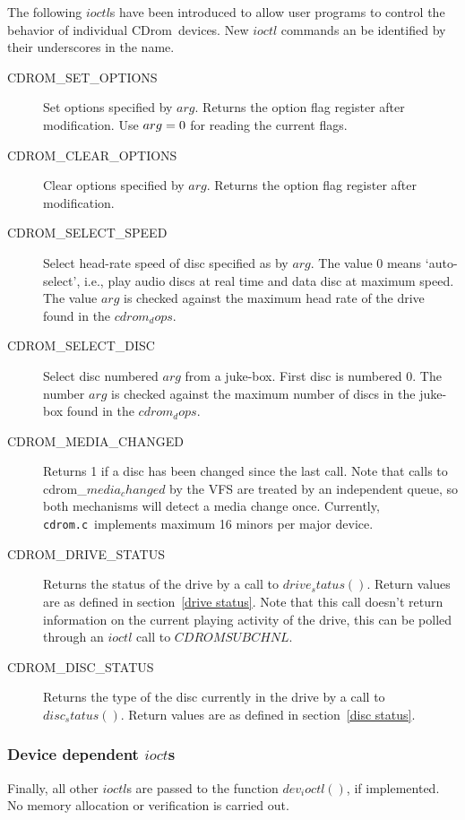 \documentclass{article}
\def\cdrom{{\sc CDrom}}
\def\cdromc{{\tt cdrom.c}}
\begin{document}
The following $ioctl$s have been introduced to allow user programs to
control the behavior of individual \cdrom\ devices. New $ioctl$
commands an be identified by their underscores in the name.
\begin{description}
\item[CDROM_SET_OPTIONS] Set options specified by $arg$. Returns the
option flag register after modification. Use  $arg = \rm0$ for reading
the current flags.
\item[CDROM_CLEAR_OPTIONS] Clear options specified by $arg$. Returns
  the option flag register after modification.
\item[CDROM_SELECT_SPEED] Select head-rate speed of disc specified as
  by $arg$. The value 0 means `auto-select', i.e., play audio discs at
  real time and data disc at maximum speed. The value $arg$ is
  checked against the maximum head rate of the drive found in
  the $cdrom_dops$.
\item[CDROM_SELECT_DISC] Select disc numbered $arg$ from a juke-box.
  First disc is numbered 0. The number $arg$ is checked against the
  maximum number of discs in the juke-box found in the $cdrom_dops$.
\item[CDROM_MEDIA_CHANGED] Returns 1 if a disc has been changed since
  the last call. Note that calls to cdrom_$media_changed$ by the VFS
  are treated by an independent queue, so both mechanisms will detect
  a media change once. Currently, \cdromc\ implements maximum 16 minors
  per major device.
\item[CDROM_DRIVE_STATUS] Returns the status of the drive by a call to
  $drive_status()$. Return values are as defined in section~\ref{drive
    status}. Note that this call doesn't return information on the
  current playing activity of the drive, this can be polled through an
  $ioctl$ call to $CDROMSUBCHNL$.
\item[CDROM_DISC_STATUS] Returns the type of the disc currently in the
  drive by a call to $disc_status()$. Return values are as defined in
  section~\ref{disc status}.
\end{description}

\subsubsection{Device dependent $ioct$s}

Finally, all other $ioctl$s are passed to the function $dev_ioctl()$,
if implemented. No memory allocation or verification is carried out. 
\end{document}
